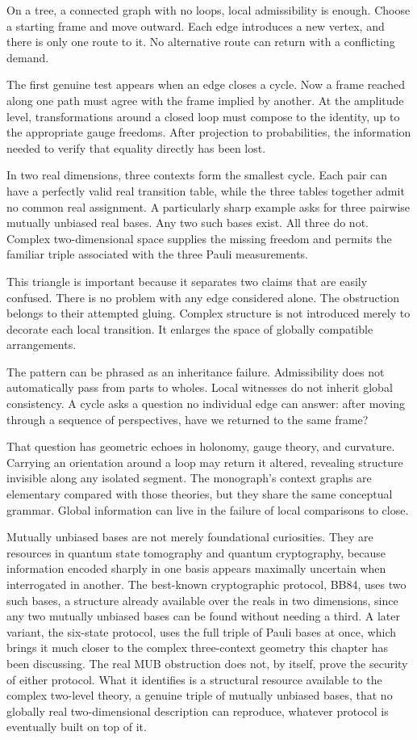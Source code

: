 \documentclass[12pt,openany]{book}
\begin{document}
On a tree, a connected graph with no loops, local admissibility is enough. Choose a starting frame and move outward. Each edge introduces a new vertex, and there is only one route to it. No alternative route can return with a conflicting demand.

The first genuine test appears when an edge closes a cycle. Now a frame reached along one path must agree with the frame implied by another. At the amplitude level, transformations around a closed loop must compose to the identity, up to the appropriate gauge freedoms. After projection to probabilities, the information needed to verify that equality directly has been lost.

In two real dimensions, three contexts form the smallest cycle. Each pair can have a perfectly valid real transition table, while the three tables together admit no common real assignment. A particularly sharp example asks for three pairwise mutually unbiased real bases. Any two such bases exist. All three do not. Complex two-dimensional space supplies the missing freedom and permits the familiar triple associated with the three Pauli measurements.

This triangle is important because it separates two claims that are easily confused. There is no problem with any edge considered alone. The obstruction belongs to their attempted gluing. Complex structure is not introduced merely to decorate each local transition. It enlarges the space of globally compatible arrangements.

The pattern can be phrased as an inheritance failure. Admissibility does not automatically pass from parts to wholes. Local witnesses do not inherit global consistency. A cycle asks a question no individual edge can answer: after moving through a sequence of perspectives, have we returned to the same frame?

That question has geometric echoes in holonomy, gauge theory, and curvature. Carrying an orientation around a loop may return it altered, revealing structure invisible along any isolated segment. The monograph's context graphs are elementary compared with those theories, but they share the same conceptual grammar. Global information can live in the failure of local comparisons to close.

Mutually unbiased bases are not merely foundational curiosities. They are resources in quantum state tomography and quantum cryptography, because information encoded sharply in one basis appears maximally uncertain when interrogated in another. The best-known cryptographic protocol, BB84, uses two such bases, a structure already available over the reals in two dimensions, since any two mutually unbiased bases can be found without needing a third. A later variant, the six-state protocol, uses the full triple of Pauli bases at once, which brings it much closer to the complex three-context geometry this chapter has been discussing. The real MUB obstruction does not, by itself, prove the security of either protocol. What it identifies is a structural resource available to the complex two-level theory, a genuine triple of mutually unbiased bases, that no globally real two-dimensional description can reproduce, whatever protocol is eventually built on top of it.
\end{document}
